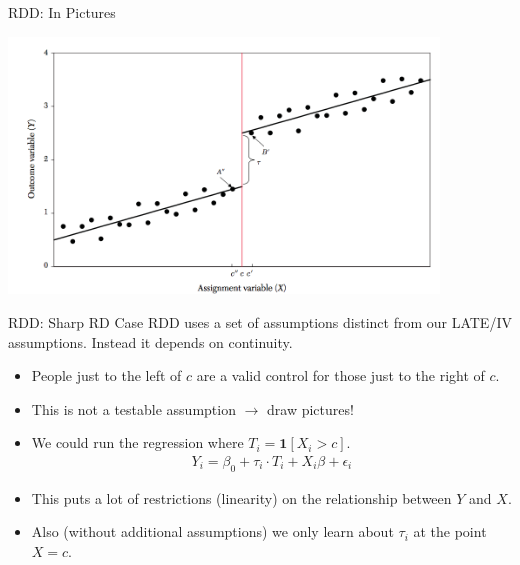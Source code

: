 \documentclass[xcolor=pdftex,dvipsnames,table,mathserif,aspectratio=169]{beamer}
\begin{document}
\begin{frame}{RDD: In Pictures}
\begin{center}
\includegraphics[width=4.5in]{./resources/ll-fig1}
\end{center}
\end{frame}


\begin{frame}{RDD: Sharp RD Case}
RDD uses a set of assumptions distinct from our LATE/IV assumptions. Instead it depends on \alert{continuity}.
\begin{itemize}
\item People just to the left of $c$ are a valid control for those just to the right of $c$.
\item \alert{This is not a testable assumption} $\rightarrow$ draw pictures!
\item We could run the regression where $T_i = \mathbf{1}[X_i > c]$.
\begin{eqnarray*}
Y_i = \beta_0 + \tau_i \cdot T_i + X_i \beta + \epsilon_i
\end{eqnarray*}
\item This puts a lot of restrictions (linearity) on the relationship between $Y$ and $X$.
\item Also (without additional assumptions) we only learn about $\tau_i$ at the point $X=c$.
\end{itemize}
\end{frame}
\end{document}
